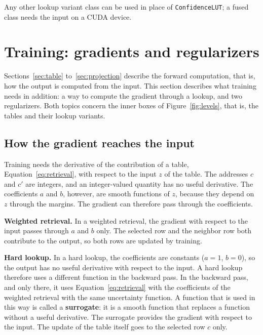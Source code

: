 \documentclass[11pt]{article}
\DeclareRobustCommand{\code}[1]{{\renewcommand{\_}{\textunderscore\allowbreak}\texttt{#1}}}
\newcommand{\term}[1]{\textbf{#1}}
\begin{document}
Any other lookup variant class can be used in place of \code{ConfidenceLUT}; a fused class needs the
input on a CUDA device.

\section{Training: gradients and regularizers}
\label{sec:training}

Sections~\ref{sec:table} to~\ref{sec:projection} describe the forward computation, that is, how the
output is computed from the input. This section describes what training needs in addition: a way to
compute the gradient through a lookup, and two regularizers. Both topics concern the inner boxes of
Figure~\ref{fig:levels}, that is, the tables and their lookup variants.

\subsection{How the gradient reaches the input}
\label{sec:gradient}

Training needs the derivative of the contribution of a table, Equation~\eqref{eq:retrieval}, with respect
to the input $z$ of the table. The addresses $c$ and $c'$ are integers, and an integer-valued quantity
has no useful derivative. The coefficients $a$ and $b$, however, are smooth functions of $z$, because
they depend on $z$ through the margins. The gradient can therefore pass through the coefficients.

\textbf{Weighted retrieval.} In a weighted retrieval, the gradient with respect to the input passes
through $a$ and $b$ only. The selected row and the neighbor row both contribute to the output, so both
rows are updated by training.

\textbf{Hard lookup.} In a hard lookup, the coefficients are constants ($a=1$, $b=0$), so the output has
no useful derivative with respect to the input. A hard lookup therefore uses a different function in the
backward pass. In the backward pass, and only there, it uses Equation~\eqref{eq:retrieval} with the
coefficients of the weighted retrieval with the same uncertainty function. A function that is used in this way is
called a \term{surrogate}: it is a smooth function that replaces a function without a useful derivative.
The surrogate provides the gradient with respect to the input. The update of the table itself goes to
the selected row $c$ only.
\end{document}
